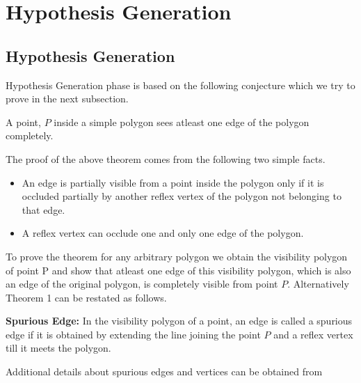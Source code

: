 \chapter{Hypothesis Generation}
\ifpdf
    \graphicspath{{Chapter2/Chapter2Figs/PNG/}{Chapter2/Chapter2Figs/PDF/}{Chapter2/Chapter2Figs/}}
\else
    \graphicspath{{Chapter2/Chapter2Figs/EPS/}{Chapter2/Chapter2Figs/}}
\fi

\section{Hypothesis Generation}

Hypothesis Generation phase is based on the following conjecture which we try to prove in the next subsection.

\begin{theorem}
 A point, $P$ inside a simple polygon sees atleast one edge of the polygon completely.
\end{theorem}
The proof of the above theorem comes from the following two simple facts.
\begin{itemize}
 \item An edge is partially visible from a point inside the polygon only if it is occluded partially by another reflex vertex of the polygon
not belonging to that edge.
\item A reflex vertex can occlude one and only one edge of the polygon.
\end{itemize}

To prove the theorem for any arbitrary polygon we obtain the visibility polygon of point P and show that atleast one edge of this
visibility polygon, which is also an edge of the original polygon, is completely visible from point $P$. Alternatively Theorem 1 can be
 restated as follows.

\begin{definition}
 {\bf Spurious Edge:} In the visibility polygon of a point, an edge is called a spurious edge if it is obtained by extending the line
 joining the point $P$ and a reflex vertex till it meets the polygon.
\end{definition}
Additional details about spurious edges and vertices can be obtained from \cite{key4}


